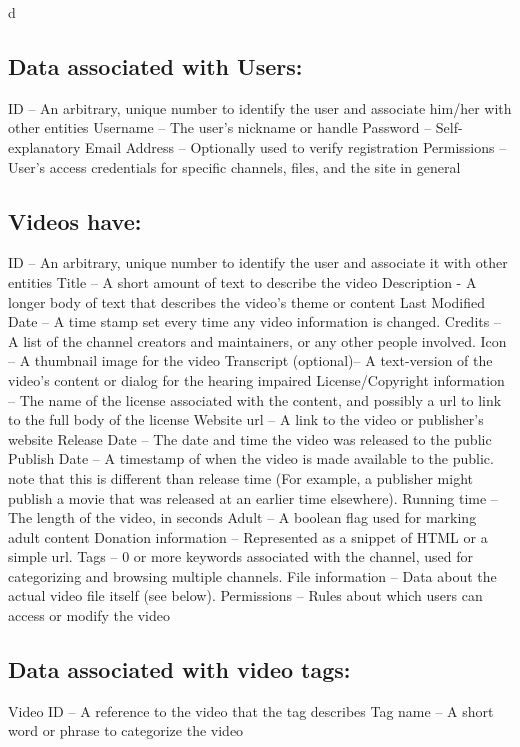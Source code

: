 d\documentclass[a4paper,12pt]{report}
\begin{document}
{{\subsection{Data associated with Users:}
ID – An arbitrary, unique number to identify the user and associate him/her with other entities
Username – The user's nickname or handle
Password – Self-explanatory
Email Address – Optionally used to verify registration
Permissions – User's access credentials for specific channels, files, and the site in general

\subsection{Videos have:}
ID – An arbitrary, unique number to identify the user and associate it with other entities 
Title – A short amount of text to describe the video
Description - A longer body of text that describes the video's theme or content
Last Modified Date – A time stamp set every time any video information is changed.
Credits – A list of the channel creators and maintainers, or any other people involved. 
Icon – A thumbnail image for the video
Transcript (optional)– A text-version of the video's content or dialog for the hearing impaired
License/Copyright information – The name of the license associated with the content, and possibly a url to link to the full body of the license
Website url – A link to the video  or publisher's website
Release Date – The date and time the video was released to the public
Publish Date – A timestamp of when the video is made available to the public. note that this is different than release time (For example, a publisher might publish a movie that was released at an earlier time elsewhere).
Running time – The length of the video, in seconds
Adult – A boolean flag used for marking adult content
Donation information – Represented as a snippet of HTML or a simple url.
Tags – 0 or more keywords associated with the channel, used for categorizing and 	browsing multiple channels.
File information – Data about the actual video file itself (see below).
Permissions – Rules about which users can access or modify the video

\subsection{Data associated with video tags:}
	Video ID – A reference to the video that the tag describes
	Tag name – A short word or phrase to categorize the video

}}
\end{document}
